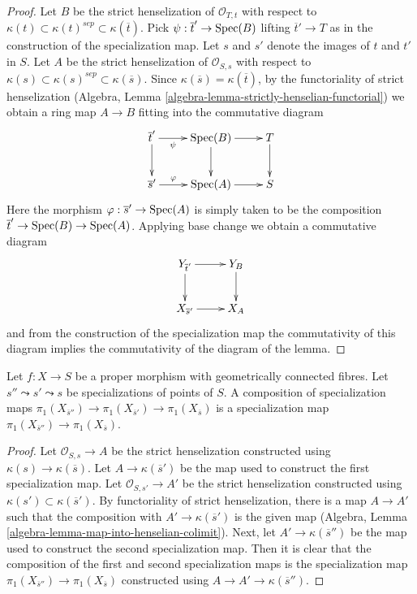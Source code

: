 \begin{proof}
Let $B$ be the strict henselization of $\mathcal{O}_{T, t}$ with respect to
$\kappa(t) \subset \kappa(t)^{sep} \subset \kappa(\overline{t})$.
Pick $\psi : \overline{t}' \to \mathop{\mathrm{Spec}}(B)$ lifting $\overline{t}' \to T$
as in the construction of the specialization map.
Let $s$ and $s'$ denote the images of $t$ and $t'$ in $S$.
Let $A$ be the strict henselization of $\mathcal{O}_{S, s}$
with respect to
$\kappa(s) \subset \kappa(s)^{sep} \subset \kappa(\overline{s})$.
Since $\kappa(\overline{s}) = \kappa(\overline{t})$,
by the functoriality of strict henselization
(Algebra, Lemma \ref{algebra-lemma-strictly-henselian-functorial})
we obtain a ring map $A \to B$ fitting into the commutative diagram
$$
\xymatrix{
\overline{t}' \ar[r]_-\psi \ar[d] & \Spec(B) \ar[d] \ar[r] & T \ar[d] \\
\overline{s}' \ar[r]^-\varphi & \Spec(A) \ar[r] & S
}
$$
Here the morphism $\varphi : \overline{s}' \to \mathop{\mathrm{Spec}}(A)$ is simply taken
to be the composition $\overline{t}' \to \mathop{\mathrm{Spec}}(B) \to \mathop{\mathrm{Spec}}(A)$.
Applying base change we obtain a commutative diagram
$$
\xymatrix{
Y_{\overline{t}'} \ar[r] \ar[d] & Y_B \ar[d] \\
X_{\overline{s}'} \ar[r] & X_A
}
$$
and from the construction of the specialization map the commutativity
of this diagram implies the commutativity of the diagram of the lemma.
\end{proof}

\begin{lemma}
\label{lemma-specialization-map-composition}
Let $f : X \to S$ be a proper morphism with geometrically connected fibres.
Let $s'' \leadsto s' \leadsto s$ be specializations of points of $S$.
A composition of specialization maps
$\pi_1(X_{\overline{s}''}) \to \pi_1(X_{\overline{s}'}) \to
\pi_1(X_{\overline{s}})$ is a specialization map
$\pi_1(X_{\overline{s}''}) \to \pi_1(X_{\overline{s}})$.
\end{lemma}

\begin{proof}
Let $\mathcal{O}_{S, s} \to A$ be the strict henselization
constructed using $\kappa(s) \to \kappa(\overline{s})$.
Let $A \to \kappa(\overline{s}')$ be the map used to construct
the first specialization map. Let $\mathcal{O}_{S, s'} \to A'$
be the strict henselization constructed using
$\kappa(s') \subset \kappa(\overline{s}')$.
By functoriality of strict henselization, there is a map
$A \to A'$ such that the composition with $A' \to \kappa(\overline{s}')$
is the given map
(Algebra, Lemma \ref{algebra-lemma-map-into-henselian-colimit}).
Next, let $A' \to \kappa(\overline{s}'')$ be the map used to
construct the second specialization map. Then it is clear that
the composition of the first and second specialization maps
is the specialization map
$\pi_1(X_{\overline{s}''}) \to \pi_1(X_{\overline{s}})$
constructed using $A \to A' \to \kappa(\overline{s}'')$.
\end{proof}

